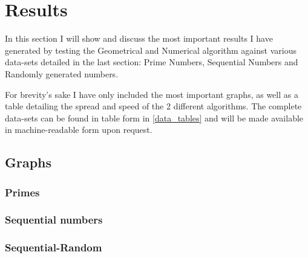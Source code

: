\section{Results}
\label{results}
In this section I will show and discuss the most important results I have generated by testing the Geometrical and Numerical algorithm against various data-sets detailed in the last section: Prime Numbers, Sequential Numbers and Randomly generated numbers. 

For brevity's sake I have only included the most important graphs, as well as a table detailing the spread and speed of the 2 different algorithms. The complete data-sets can be found in table form in \ref{data_tables} and will be made available in machine-readable form upon request.

\subsection{Graphs}

\subsubsection{Primes}

\subsubsection{Sequential numbers}

\subsubsection{Sequential-Random}

